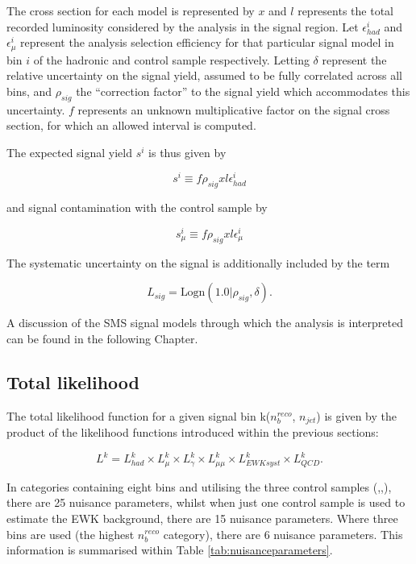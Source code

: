 The cross section for each model is represented by $x$ and $l$ represents the total recorded luminosity considered by the analysis in the signal region. Let $\epsilon^{i}_{had}$ and $\epsilon^{i}_{\mu}$ represent the analysis selection efficiency for that particular signal model in \theht bin $i$ of the hadronic and \mupjets control sample respectively. Letting $\delta$ represent the relative uncertainty on the signal yield, assumed to be fully correlated across all bins, and $\rho_{sig}$ the ``correction factor'' to the signal yield which accommodates this uncertainty. $f$ represents an unknown multiplicative factor on the signal cross section, for which an allowed interval is computed.

The expected signal yield $s^{i}$ is thus given by

\begin{equation}
s^{i} \equiv f\rho_{sig}xl\epsilon^{i}_{had}
\end{equation}

and signal contamination with the \mupjets control sample by

\begin{equation}
s^{i}_{\mu} \equiv f\rho_{sig}xl\epsilon^{i}_{\mu}
\end{equation}

The systematic uncertainty on the signal is additionally included by the term

\begin{equation}
L_{sig} = \text{Logn}(1.0|\rho_{sig},\delta).
\end{equation}

A discussion of the \ac{SMS} signal models through which the analysis is interpreted can be found in the following Chapter. 

\subsection{Total likelihood}
\label{subsec:totallikelihood}

The total likelihood function for a given signal bin k($n_{b}^{reco}$, $n_{jet}$) is given by the product of the likelihood functions introduced within the previous sections:

\begin{equation}
L^{k} = L^{k}_{had} \times  L^{k}_{\mu} \times  L^{k}_{\gamma} \times  L^{k}_{\mu\mu} \times  L^{k}_{EWK syst} \times  L^{k}_{QCD}.
\end{equation}

In categories containing eight \theht bins and utilising the three control samples (\mupjets,\dimupjets,\gpjets), there are 25 nuisance parameters, whilst when just one control sample is used to estimate the \ac{EWK} background, there are 15 nuisance parameters. Where three \theht bins are used (the highest $n_{b}^{reco}$ category), there are 6 nuisance parameters. This information is summarised within Table \ref{tab:nuisanceparameters}.

